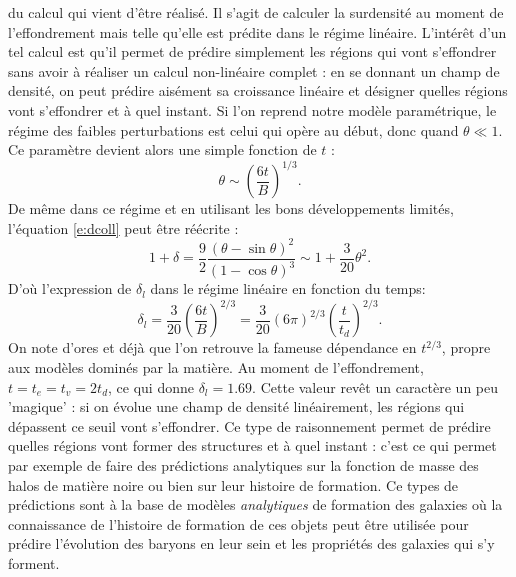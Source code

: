  du calcul qui vient d'être réalisé. Il s'agit de calculer la surdensité au moment de l'effondrement mais telle qu'elle est prédite dans le régime linéaire. L'intérêt d'un tel calcul est qu'il permet de prédire simplement les régions qui vont s'effondrer sans avoir à réaliser un calcul non-linéaire complet : en se donnant un champ de densité, on peut prédire aisément sa croissance linéaire et désigner quelles régions vont s'effondrer et à quel instant. Si l'on reprend notre modèle paramétrique, le régime des faibles perturbations est celui qui opère au début, donc quand $\theta \ll 1$. Ce paramètre devient alors une simple fonction de $t$ :
\begin{equation}
\theta \sim \left(\frac{6t}{B}\right)^{1/3}.
\end{equation}
De même dans ce régime et en utilisant les bons développements limités, l'équation \ref{e:dcoll} peut être réécrite :
\begin{equation}
1+\delta =\frac{9}{2}\frac{(\theta -\sin \theta)^2}{(1-\cos \theta)^3}\sim 1+\frac{3}{20} \theta^2.
\end{equation}
D'où l'expression de $\delta_l$ dans le régime linéaire en fonction du temps:
\begin{equation}
\delta_l=\frac{3}{20}\left(\frac{6t}{B}\right)^{2/3}=\frac{3}{20}(6\pi)^{2/3}\left(\frac{t}{t_d}\right)^{2/3}.
\end{equation}
On note d'ores et déjà que l'on retrouve la fameuse dépendance en $t^{2/3}$, propre aux modèles dominés par la matière. Au moment de l'effondrement, $t=t_e=t_v=2t_d$, ce qui donne $\delta_l=1.69$. Cette valeur revêt un caractère un peu 'magique' : si on évolue une champ de densité linéairement, les régions qui dépassent ce seuil vont s'effondrer. Ce type de raisonnement permet de prédire quelles régions vont former des structures et à quel instant : c'est ce qui permet par exemple de faire des prédictions analytiques sur la fonction de masse des halos de matière noire ou bien sur leur histoire de formation. Ce types de prédictions sont à la base de modèles \textit{analytiques} de formation des galaxies où la connaissance de l'histoire de formation de ces objets peut être utilisée pour prédire l'évolution des baryons en leur sein et les propriétés des galaxies qui s'y forment.

